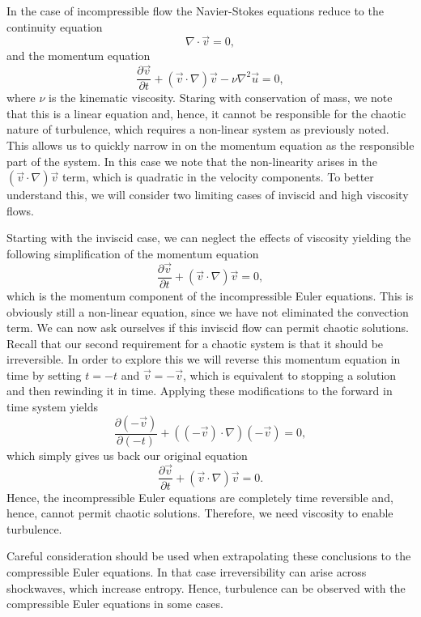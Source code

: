 In the case of incompressible flow the Navier-Stokes equations reduce to the continuity equation
\begin{equation}
	\nabla \cdot \vec{v} = 0,
\end{equation}
and the momentum equation
\begin{equation}
	\frac{\partial \vec{v}}{\partial t} + \left(\vec{v} \cdot \nabla \right)\vec{v} - \nu \nabla^2 \vec{u} = 0,
\end{equation}
where $\nu$ is the kinematic viscosity. Staring with conservation of mass, we note that this is a linear equation and, hence, it cannot be responsible for the chaotic nature of turbulence, which requires a non-linear system as previously noted. This allows us to quickly narrow in on the momentum equation as the responsible part of the system. In this case we note that the non-linearity arises in the $\left(\vec{v} \cdot \nabla \right)\vec{v}$ term, which is quadratic in the velocity components. To better understand this, we will consider two limiting cases of inviscid and high viscosity flows.

Starting with the inviscid case, we can neglect the effects of viscosity yielding the following simplification of the momentum equation
\begin{equation}
	\frac{\partial \vec{v}}{\partial t} + \left(\vec{v} \cdot \nabla \right)\vec{v} = 0,
\end{equation}
which is the momentum component of the incompressible Euler equations. This is obviously still a non-linear equation, since we have not eliminated the convection term. We can now ask ourselves if this inviscid flow can permit chaotic solutions. Recall that our second requirement for a chaotic system is that it should be irreversible. In order to explore this we will reverse this momentum equation in time by setting $t=-t$ and $\vec{v} = -\vec{v}$, which is equivalent to stopping a solution and then rewinding it in time. Applying these modifications to the forward in time system yields
\begin{equation}
	\frac{\partial (-\vec{v})}{\partial (-t)} + \left((-\vec{v}) \cdot \nabla \right)(-\vec{v}) = 0,
\end{equation}
which simply gives us back our original equation
\begin{equation}
	\frac{\partial \vec{v}}{\partial t} + \left(\vec{v} \cdot \nabla \right)\vec{v} = 0.
\end{equation}
Hence, the incompressible Euler equations are completely time reversible and, hence, cannot permit chaotic solutions. Therefore, we need viscosity to enable turbulence.
\begin{remark}
Careful consideration should be used when extrapolating these conclusions to the compressible Euler equations. In that case irreversibility can arise across shockwaves, which increase entropy. Hence, turbulence can be observed with the compressible Euler equations in some cases.
\end{remark}

